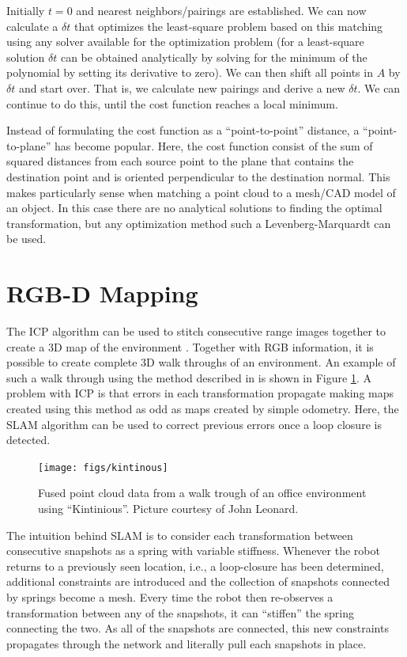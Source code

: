 \documentclass[paper=6.14in:9.21in,pagesize=pdftex,11pt,twoside,openright]{scrbook}
\begin{document}
Initially $t=0$ and nearest neighbors/pairings are established. We can now calculate a $ \delta t$ that optimizes the least-square problem based on this matching using any solver available for the optimization problem (for a least-square solution $ \delta t$ can be obtained analytically by solving for the minimum of the polynomial by setting its derivative to zero). We can then shift all points in $ A$ by $ \delta t$ and start over. That is, we calculate new pairings and derive a new $ \delta t$.  We can continue to do this, until the cost function reaches a local minimum.

Instead of formulating the cost function as a ``point-to-point'' distance, a ``point-to-plane'' has become popular. Here, the cost function consist of the sum of squared distances from each source point to the plane that contains the destination point and is oriented perpendicular to the destination normal. This makes particularly sense when matching a point cloud to a mesh/CAD model of an object. In this case there are no analytical solutions to finding the optimal transformation, but any optimization method such a Levenberg-Marquardt can be used.

\section{RGB-D Mapping}
The ICP algorithm can be used to stitch consecutive range images together to create a 3D map of the environment \cite{henry2010rgb}. Together with RGB information, it is possible to create complete 3D walk throughs of an environment. An example of such a walk through using the method described in \cite{whelan2013robust} is shown in Figure \ref{fig:kintinous}.
A problem with ICP is that errors in each transformation propagate making maps created using this method as odd as maps created by simple odometry. Here, the SLAM algorithm can be used to correct previous errors once a loop closure is detected.


\begin{figure}
\centering
\texttt{[image: figs/kintinous]}
\caption{Fused point cloud data from a walk trough of an office environment using ``Kintinious''. Picture courtesy of John Leonard.\label{fig:kintinous}}
\end{figure}

The intuition behind SLAM is to consider each transformation between consecutive snapshots as a spring with variable stiffness. Whenever the robot returns to a previously seen location, i.e., a loop-closure has been determined, additional constraints are introduced and the collection of snapshots connected by springs become a mesh. Every time the robot then re-observes a transformation between any of the snapshots, it can ``stiffen'' the spring connecting the two. As all of the snapshots are connected, this new constraints propagates through the network and literally pull each snapshots in place.
\end{document}
